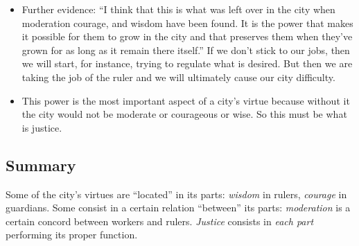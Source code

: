 \documentclass[oneside]{article}
\begin{document}
\begin{itemize}
\begin{description}
\begin{itemize}
\item Further evidence: ``I think that this is what was left over in the city when moderation courage, and wisdom have been found. It is the power that makes it possible for them to grow in the city and that preserves them when they've grown for as long as it remain there itself.'' If we don't stick to our jobs, then we will start, for instance, trying to regulate what is desired. But then we are taking the job of the ruler and we will ultimately cause our city difficulty.
\item This power is the most important aspect of a city's virtue because without it the city would not be moderate or courageous or wise. So this must be what is justice.
\end{itemize}
\end{description}
\end{itemize}

\subsection*{Summary}

 Some of the city's virtues are ``located'' in its parts: \emph{wisdom} in rulers, \emph{courage} in guardians. Some consist in a certain relation ``between'' its parts: \emph{moderation} is a certain concord between workers and rulers. \emph{Justice} consists in \emph{each part }performing its proper function.
\end{document}
